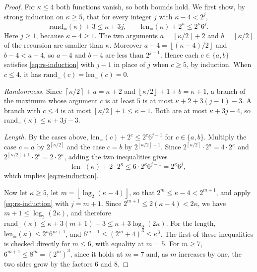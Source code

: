 \documentclass[11pt,letterpaper]{article}
\theoremstyle{definition}
\theoremstyle{remark}
\newcommand{\ceil}[1]{\left\lceil #1\right\rceil}
\newcommand{\floor}[1]{\left\lfloor #1\right\rfloor}
\newcommand{\lgx}{\log_2}
\begin{document}
\begin{proof}
For \(\kappa\le4\) both functions vanish, so both bounds hold. We first
show, by strong induction on \(\kappa\ge5\), that for every integer
\(j\) with \(\kappa-4<2^j\),
\begin{equation}\label{eq:rs-induction}
 \mathrm{rand}_=(\kappa)+3\le\kappa+3j,\qquad
 \mathrm{len}_=(\kappa)+2^\kappa\le2^\kappa6^j.
\end{equation}
Here \(j\ge1\), because \(\kappa-4\ge1\). The two arguments
\(a=\floor{\kappa/2}+2\) and \(b=\ceil{\kappa/2}\) of the recursion are
smaller than \(\kappa\). Moreover \(a-4=\floor{(\kappa-4)/2}\) and
\(b-4<a-4\), so \(a-4\) and \(b-4\) are less than \(2^{j-1}\). Hence each
\(c\in\{a,b\}\) satisfies \eqref{eq:rs-induction} with \(j-1\) in place
of \(j\) when \(c\ge5\), by induction. When \(c\le4\), it has
\(\mathrm{rand}_=(c)=\mathrm{len}_=(c)=0\).

\emph{Randomness.} Since \(\ceil{\kappa/2}+a=\kappa+2\) and
\(\floor{\kappa/2}+1+b=\kappa+1\), a branch of the maximum whose
argument \(c\) is at least \(5\) is at most \(\kappa+2+3(j-1)-3\). A
branch with \(c\le4\) is at most \(\floor{\kappa/2}+1\le\kappa-1\). Both
are at most \(\kappa+3j-4\), so
\(\mathrm{rand}_=(\kappa)\le\kappa+3j-3\).

\emph{Length.} By the cases above,
\(\mathrm{len}_=(c)+2^c\le2^c6^{j-1}\) for \(c\in\{a,b\}\). Multiply
the case \(c=a\) by \(2^{\ceil{\kappa/2}}\) and the case \(c=b\) by
\(2^{\floor{\kappa/2}+1}\). Since
\(2^{\ceil{\kappa/2}}\cdot2^a=4\cdot2^\kappa\) and
\(2^{\floor{\kappa/2}+1}\cdot2^b=2\cdot2^\kappa\), adding the two
inequalities gives
\[
 \mathrm{len}_=(\kappa)+2\cdot2^\kappa
 \le6\cdot2^\kappa6^{j-1}=2^\kappa6^j,
\]
which implies \eqref{eq:rs-induction}.

Now let \(\kappa\ge5\), let \(m=\floor{\lgx(\kappa-4)}\), so that
\(2^m\le\kappa-4<2^{m+1}\), and apply \eqref{eq:rs-induction} with
\(j=m+1\). Since \(2^{m+1}\le2(\kappa-4)<2\kappa\), we have
\(m+1\le\lgx(2\kappa)\), and therefore
\(\mathrm{rand}_=(\kappa)\le\kappa+3(m+1)-3\le\kappa+3\lgx(2\kappa)\).
For the length, \(\mathrm{len}_=(\kappa)\le2^\kappa6^{m+1}\), and
\(6^{m+1}\le(2^m+4)^3\le\kappa^3\). The first of these inequalities is
checked directly for \(m\le6\), with equality at \(m=5\). For \(m\ge7\),
\(6^{m+1}\le8^m=(2^m)^3\), since it holds at \(m=7\) and, as \(m\) increases by
one, the two sides grow by the factors \(6\) and \(8\).
\end{proof}
\end{document}
